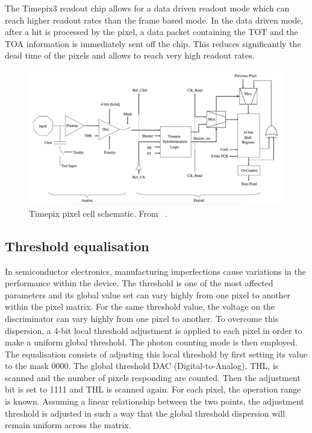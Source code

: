 The Timepix3 readout chip allows for a data driven readout mode which
can reach higher readout rates than the frame based mode. In the data
driven mode, after a hit is processed by the pixel, a data packet
containing the TOT and the TOA information is immediately sent off the
chip. This reduces significantly the dead time of the pixels and
allows to reach very high readout rates.

\begin{figure}[htbp] 
  \centering
  \includegraphics[width=\textwidth]{./figures/Calibration/Timepix_pixel_cell_schematic.jpg}
  \caption{Timepix pixel cell schematic. From ~\cite{art:tmpx}.}
  \label{fig:Timepix_pixel_cell_schematic}
\end{figure}

\subsection{Threshold equalisation} \label{sec:ThresholdEqualisation}
In semiconductor electronics, manufacturing imperfections cause
variations in the performance within the device. The threshold is one
of the most affected parameters and its global value set can vary
highly from one pixel to another within the pixel matrix. For the same
threshold value, the voltage on the discriminator can vary highly from
one pixel to another. To overcome this dispersion, a 4-bit local
threshold adjustment is applied to each pixel in order to make a
uniform global threshold. The photon counting mode is then
employed. The equalisation consists of adjusting this local threshold
by first setting its value to the mask 0000. The global threshold DAC
(Digital-to-Analog), THL, is scanned and the number of pixels
responding are counted. Then the adjustment bit is set to 1111 and THL
is scanned again. For each pixel, the operation range is
known. Assuming a linear relationship between the two points, the
adjustment threshold is adjusted in such a way that the global
threshold dispersion will remain uniform across the matrix.

